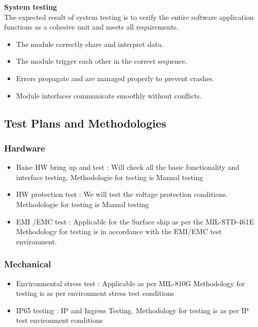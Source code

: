 \documentclass[a4paper,12pt]{article}
\begin{document}
	\textbf{System testing}
\\
The expected result of system testing is to verify the entire software application functions as a cohesive unit and meets all requirements.

\begin{itemize}
	\item The module correctly share and interpret data.
	\item The module trigger each other in the correct sequence.
	\item Errors propagate and are managed properly to prevent crashes.
	\item Module interfaces communicate smoothly without conflicts.
	
\end{itemize}
		
	
	\subsection{Test Plans and Methodologies}
	\subsubsection{Hardware}
	
	\begin{itemize}
		\item Baisc HW bring up and test :
		Will check all the basic functionality and interface testing. Methodologie for testing is Manual testing 
		\item HW protection test : 
		We will test the voltage protection conditions. Methodologie for testing is Manual testing 
		\item EMI /EMC test : 
		Applicable for the Surface ship as per the MIL-STD-461E Methodology for testing is in accordance with the EMI/EMC test environment.
		
		
		
	\end{itemize}
	\subsubsection{Mechanical}
	 \begin{itemize}
	 	\item Environmental stress test :
	 	Applicable as per MIL-810G   Methodology for testing is as per environment stress test conditions
	 	\item IP65 testing : 
	 	IP and Ingress Testing. Methodology for testing is as per IP test environment conditions
	 \end{itemize}
\end{document}
